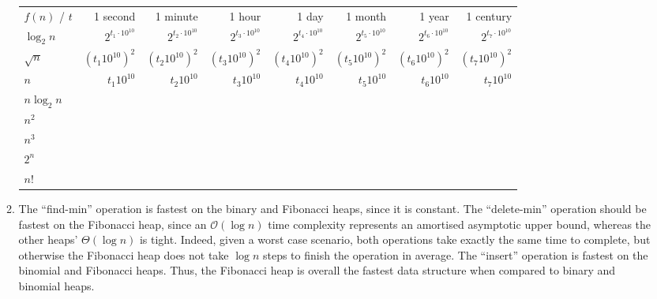 \documentclass[12pt]{article}
\begin{document}
\begin{enumerate}
\begin{enumerate}
\begin{table}[htbp]
\begin{tabular}{l*{7}{r}}
                    $f(n)$ / $t$ & 1 second & 1 minute & 1 hour & 1 day & 1 month & 1 year & 1 century \\
                    $\log_{2} n$ & $2^{t_{1} \cdot 10^{10}}$ & $2^{t_{2} \cdot 10^{10}}$ & $2^{t_{3} \cdot 10^{10}}$ & $2^{t_{4} \cdot 10^{10}}$ & $2^{t_{5} \cdot 10^{10}}$ & $2^{t_{6} \cdot 10^{10}}$ & $2^{t_{7} \cdot 10^{10}}$ \\
                    $\sqrt{n}$ & $(t_{1} 10^{10})^{2}$ & $(t_{2} 10^{10})^{2}$ & $(t_{3} 10^{10})^{2}$ & $(t_{4} 10^{10})^{2}$ & $(t_{5} 10^{10})^{2}$ & $(t_{6} 10^{10})^{2}$ & $(t_{7} 10^{10})^{2}$ \\
                    $n$ & $t_{1} 10^{10}$ & $t_{2} 10^{10}$ & $t_{3} 10^{10}$ & $t_{4} 10^{10}$ & $t_{5} 10^{10}$ & $t_{6} 10^{10}$ & $t_{7} 10^{10}$ \\
                    $n \log_{2} n$ & \\
                    $n^{2}$ & \\
                    $n^{3}$ & \\
                    $2^{n}$ & \\
                    $n!$ & \\
                \bottomrule
            \end{tabular}
            \label{tab:1}
        \end{table}
        \item The ``find-min'' operation is fastest on the binary and Fibonacci heaps, since it is constant. The ``delete-min'' operation should be fastest on the Fibonacci heap, since an $\mathcal{O}(\log n)$ time complexity represents an amortised asymptotic upper bound, whereas the other heaps' $\Theta(\log n)$ is tight. Indeed, given a worst case scenario, both operations take exactly the same time to complete, but otherwise the Fibonacci heap does not take $\log n$ steps to finish the operation in average. The ``insert'' operation is fastest on the binomial and Fibonacci heaps. Thus, the Fibonacci heap is overall the fastest data structure when compared to binary and binomial heaps.
    \end{enumerate}
\end{enumerate}
\end{document}
